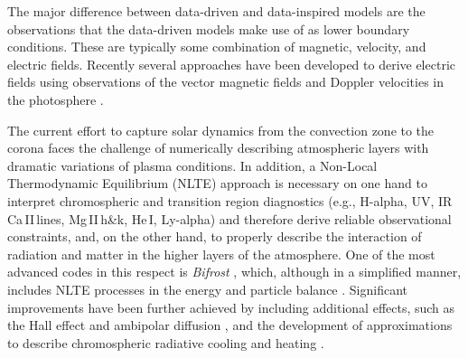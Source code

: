 \documentclass[]{article}
\newcommand{\SC}{\bf \color{red}}
\begin{document}
  The major difference between data-driven and data-inspired models are the observations that the data-driven models make use of as lower boundary conditions. These are typically some combination of magnetic, velocity, and electric fields. Recently several approaches have been developed to derive electric fields using observations of the vector magnetic fields and Doppler velocities in the photosphere \citep[see e.g.][]{Fisher2020}.


The current effort to capture solar dynamics from the convection zone to the corona faces the challenge of numerically describing atmospheric layers with dramatic variations of plasma conditions. 
In addition, a Non-Local Thermodynamic Equilibrium (NLTE) approach is necessary on one hand to interpret chromospheric and transition region diagnostics 
 (e.g., H-alpha, UV, IR Ca\,II\,lines, Mg\,II\,h\&k, He\,I, Ly-alpha)  \citep[e.g.][]{Leenaarts2013a, Stepan2015} and therefore derive reliable observational constraints, and, on the other hand, to properly describe the interaction of radiation and matter in the higher layers of the atmosphere.
 One of the most advanced codes in this respect is \textit {Bifrost} \citep{Gudiksen2011}, which,  although in a simplified manner,  includes NLTE processes in the energy and particle balance \citep{Carlsson2016,Hansteen2017}. Significant improvements have been further achieved by including additional effects, such as the Hall effect and ambipolar diffusion \citep[e.g.,][]{Martinez-Sykora2012, Khomenko2020}, and the development of approximations to describe chromospheric radiative cooling and heating \citep{Carlsson2012}. 
\end{document}
